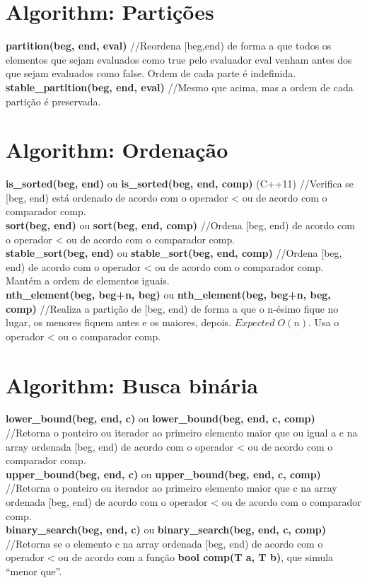 \begin{multicols}{2}
\section{Algorithm: Partições}
\textbf{partition(beg, end, eval)} //Reordena [beg,end) de forma a que todos os elementos que sejam evaluados como true pelo evaluador eval venham antes dos que sejam evaluados como false. Ordem de cada parte é indefinida.\\
\textbf{stable\_partition(beg, end, eval)} //Mesmo que acima, mas a ordem de cada partição é preservada.

\section{Algorithm: Ordenação}
\textbf{is\_sorted(beg, end)} ou \textbf{is\_sorted(beg, end, comp)} (C++11) //Verifica se [beg, end) está ordenado de acordo com o operador < ou de acordo com o comparador comp.\\
\textbf{sort(beg, end)} ou \textbf{sort(beg, end, comp)} //Ordena [beg, end) de acordo com o operador < ou de acordo com o comparador comp.\\
\textbf{stable\_sort(beg, end)} ou \textbf{stable\_sort(beg, end, comp)} //Ordena [beg, end) de acordo com o operador < ou de acordo com o comparador comp. Mantém a ordem de elementos iguais.\\
\textbf{nth\_element(beg, beg+n, beg)} ou \textbf{nth\_element(beg, beg+n, beg, comp)} //Realiza a partição de [beg, end) de forma a que o n-ésimo fique no lugar, os menores fiquem antes e os maiores, depois. $Expected \; O(n)$. Usa o operador < ou o comparador comp.

\section{Algorithm: Busca binária}
\textbf{lower\_bound(beg, end, c)} ou \textbf{lower\_bound(beg, end, c, comp)} //Retorna o ponteiro ou iterador ao primeiro elemento maior que ou igual a c na array ordenada [beg, end) de acordo com o operador < ou de acordo com o comparador comp.\\
\textbf{upper\_bound(beg, end, c)} ou \textbf{upper\_bound(beg, end, c, comp)} //Retorna o ponteiro ou iterador ao primeiro elemento maior que c na array ordenada [beg, end) de acordo com o operador < ou de acordo com o comparador comp.\\
\textbf{binary\_search(beg, end, c)} ou \textbf{binary\_search(beg, end, c, comp)} //Retorna se o elemento c na array ordenada [beg, end) de acordo com o operador < ou de acordo com a função \textbf{bool comp(T a, T b)}, que simula ``menor que''.


\end{multicols}
